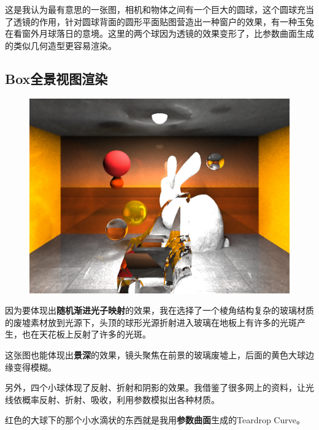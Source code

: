 \documentclass{article}
\begin{document}
这是我认为最有意思的一张图，相机和物体之间有一个巨大的圆球，这个圆球充当了透镜的作用，针对圆球背面的圆形平面贴图营造出一种窗户的效果，有一种玉兔在看窗外月球落日的意境。这里的两个球因为透镜的效果变形了，比参数曲面生成的类似几何造型更容易渲染。

\subsection{Box全景视图渲染}

\begin{figure}[H]
\includegraphics[width=\columnwidth]{2.png}
\end{figure}

因为要体现出{\bf{随机渐进光子映射}}的效果，我在选择了一个棱角结构复杂的玻璃材质的废墟素材放到光源下，头顶的球形光源折射进入玻璃在地板上有许多的光斑产生，也在天花板上反射了许多的光斑。

这张图也能体现出{\bf{景深}}的效果，镜头聚焦在前景的玻璃废墟上，后面的黄色大球边缘变得模糊。

另外，四个小球体现了反射、折射和阴影的效果。我借鉴了很多网上的资料，让光线依概率反射、折射、吸收，利用参数模拟出各种材质。

红色的大球下的那个小水滴状的东西就是我用{\bf{参数曲面}}生成的Teardrop Curve。
\end{document}
